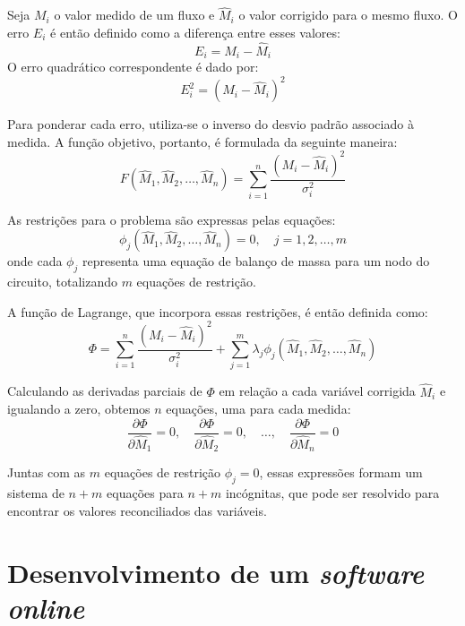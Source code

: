 Seja $M_i$ o valor medido de um fluxo e $\hat{M}_i$ o valor corrigido para o mesmo fluxo. O erro $E_i$ é então definido como a diferença entre esses valores:
\begin{equation}
	E_i = M_i - \hat{M}_i
\end{equation}
O erro quadrático correspondente é dado por:
\begin{equation}
	E_i^2 = (M_i - \hat{M}_i)^2
\end{equation}

Para ponderar cada erro, utiliza-se o inverso do desvio padrão associado à medida. A função objetivo, portanto, é formulada da seguinte maneira:
\begin{equation}
	F(\hat{M}_1, \hat{M}_2, \dots, \hat{M}_n) = \sum_{i=1}^n \frac{(M_i - \hat{M}_i)^2}{\sigma_i^2}
\end{equation}

As restrições para o problema são expressas pelas equações:
\begin{equation}
	\phi_j(\hat{M}_1, \hat{M}_2, \dots, \hat{M}_n) = 0, \quad j = 1, 2, \dots, m
\end{equation}
onde cada $\phi_j$ representa uma equação de balanço de massa para um nodo do circuito, totalizando $m$ equações de restrição.

A função de Lagrange, que incorpora essas restrições, é então definida como:
\begin{equation}
	\Phi = \sum_{i=1}^n \frac{(M_i - \hat{M}_i)^2}{\sigma_i^2} + \sum_{j=1}^m \lambda_j \phi_j(\hat{M}_1, \hat{M}_2, \dots, \hat{M}_n)
\end{equation}

Calculando as derivadas parciais de $\Phi$ em relação a cada variável corrigida $\hat{M}_i$ e igualando a zero, obtemos $n$ equações, uma para cada medida:
\begin{equation}
	\frac{\partial \Phi}{\partial \hat{M}_1} = 0, \quad \frac{\partial \Phi}{\partial \hat{M}_2} = 0, \quad \dots, \quad \frac{\partial \Phi}{\partial \hat{M}_n} = 0
\end{equation}

Juntas com as $m$ equações de restrição $\phi_j = 0$, essas expressões formam um sistema de $n + m$ equações para $n + m$ incógnitas, que pode ser resolvido para encontrar os valores reconciliados das variáveis.


\section{Desenvolvimento de um \textit{software online}}


